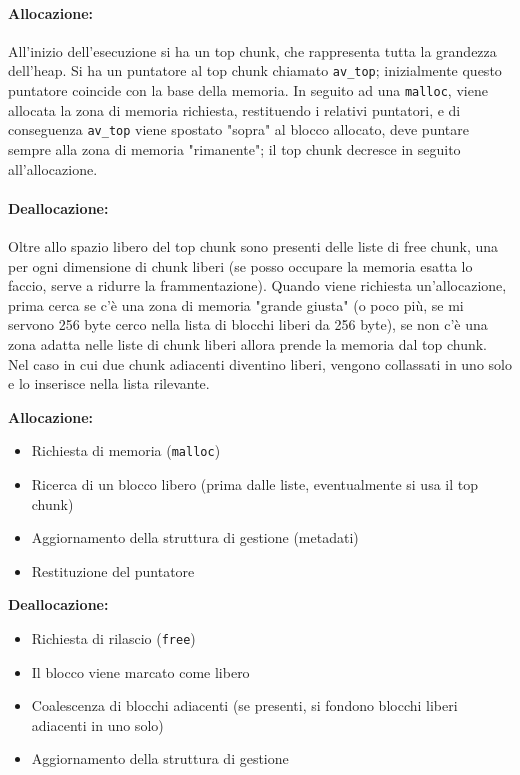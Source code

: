 \paragraph{Allocazione:} All'inizio dell'esecuzione si ha un top chunk, che rappresenta tutta la grandezza dell'heap. Si ha un puntatore al top chunk chiamato \texttt{av\_top}; inizialmente questo puntatore coincide con la base della memoria. In seguito ad una \texttt{malloc}, viene allocata la zona di memoria richiesta, restituendo i relativi puntatori, e di conseguenza  \texttt{av\_top} viene spostato "sopra" al blocco allocato, deve puntare sempre alla zona di memoria "rimanente"; il top chunk decresce in seguito all'allocazione.\\

\paragraph{Deallocazione:} Oltre allo spazio libero del top chunk sono presenti delle liste di free chunk, una per ogni dimensione di chunk liberi (se posso occupare la memoria esatta lo faccio, serve a ridurre la frammentazione). Quando viene richiesta un'allocazione, prima cerca se c'è una zona di memoria "grande giusta" (o poco più, se mi servono 256 byte cerco nella lista di blocchi liberi da 256 byte), se non c'è una zona adatta nelle liste di chunk liberi allora prende la memoria dal top chunk.\\

Nel caso in cui due chunk adiacenti diventino liberi, vengono collassati in uno solo e lo inserisce nella lista rilevante.\\

\vfill

\begin{minipage}{0.43\textwidth}
	\textbf{Allocazione:}
	\begin{itemize}
		\item Richiesta di memoria (\texttt{malloc})
		\item Ricerca di un blocco libero (prima dalle liste, eventualmente si usa il top chunk)
		\item Aggiornamento della struttura di gestione (metadati)
		\item Restituzione del puntatore
	\end{itemize}
\end{minipage}
\hfill
\begin{minipage}{0.43\textwidth}
	\textbf{Deallocazione:}
	\begin{itemize}
		\item Richiesta di rilascio (\texttt{free})
		\item Il blocco viene marcato come libero 
		\item Coalescenza di blocchi adiacenti (se presenti, si fondono blocchi liberi adiacenti in uno solo)
		\item Aggiornamento della struttura di gestione
	\end{itemize}
\end{minipage}


